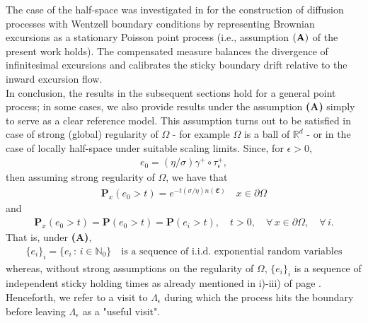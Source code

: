 \documentclass[11pt,a4paper]{article}
\newcommand{\magenta}{black}
\begin{document}
{The case of the half-space was investigated in \cite{Watanabe79} for the construction of diffusion processes with Wentzell boundary conditions by representing Brownian excursions as a stationary Poisson point process (i.e., assumption ${\bf (A)}$ of the present work holds). The compensated measure balances the divergence of infinitesimal excursions and calibrates the sticky boundary drift relative to the inward excursion flow.\\



In conclusion, the results in the subsequent sections hold for a general point process; in some cases, we also provide results under the assumption {\bf (A)} simply to serve as a clear reference model. This assumption turns out to be satisfied in case of strong (global) regularity of $\Omega$ - for example $\Omega$ is a ball of $\mathbb{R}^d$ - or in the case of locally half-space under suitable scaling limits.} Since, for $\epsilon>0$,
\begin{align}
e_0 = (\eta/\sigma) \gamma^+ \circ \tau^+_\epsilon,
\label{e0A}
\end{align}
then assuming strong regularity of $\Omega$, we have that
\begin{align}
\mathbf{P}_x(e_0 > t) = e^{-t (\sigma/\eta) n(\mathfrak{E})} \quad x \in \partial \Omega
\label{lawHoldingTimeX}
\end{align}
and
\begin{align*}
\mathbf{P}_x(e_0 > t) = \mathbf{P}(e_0 > t)=\mathbf{P}(e_i > t), \quad t >0, \quad \forall\, x \in \partial \Omega, \quad \forall \, i.
\end{align*}
{\color{\magenta} That is, under {\bf (A)},
\begin{align*}
\{e_i\}_i = \{e_i\,:\, i \in \mathbb{N}_0\} \quad \textrm{is a sequence of i.i.d. exponential random variables}
\end{align*}
whereas, without strong assumptions on the regularity of $\Omega$, $\{e_i \}_i$ is a sequence of independent sticky holding times as already mentioned in i)-iii) of page \pageref{propertiesSeqSHT}.\\

Henceforth, we refer to a visit to \(\Lambda _{\epsilon }\) during which the process hits the boundary before leaving \(\Lambda _{\epsilon }\) as a "useful visit".\\
 
}
\end{document}
